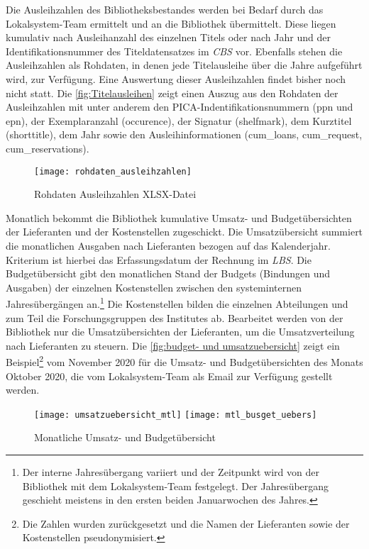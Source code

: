 Die Ausleihzahlen des Bibliotheksbestandes werden bei Bedarf durch das Lokalsystem-Team ermittelt und an die Bibliothek übermittelt. 
Diese liegen kumulativ nach Ausleihanzahl des einzelnen Titels oder nach Jahr und der Identifikationsnummer des Titeldatensatzes im 
\textit{\acrshort{CBS}} vor. Ebenfalls stehen die Ausleihzahlen als Rohdaten, in denen jede Titelausleihe über die Jahre aufgeführt wird, zur Verfügung.
Eine Auswertung dieser Ausleihzahlen findet bisher noch nicht statt. Die \autoref{fig:Titelausleihen} zeigt einen Auszug aus den Rohdaten der Ausleihzahlen mit 
unter anderem den PICA-Indentifikationsnummern (ppn und epn), der Exemplaranzahl (occurence), der Signatur (shelfmark), dem Kurztitel (shorttitle),
dem Jahr sowie den Ausleihinformationen (cum\_loans, cum\_request, cum\_reservations).


\begin{figure}[H]
    \centering
        \texttt{[image: rohdaten\_ausleihzahlen]}
        \caption{Rohdaten Ausleihzahlen XLSX-Datei}
        \label{fig:Titelausleihen}
\end{figure}


Monatlich bekommt die Bibliothek kumulative Umsatz- und Budgetübersichten der Lieferanten und der Kostenstellen zugeschickt.
Die Umsatzübersicht summiert die monatlichen Ausgaben nach Lieferanten bezogen auf das Kalenderjahr. Kriterium ist hierbei das Erfassungsdatum der Rechnung im \textit{\acrshort{LBS}}. 
Die Budgetübersicht gibt den monatlichen Stand der Budgets (Bindungen und Ausgaben) der einzelnen Kostenstellen zwischen den systeminternen Jahresübergängen an.\footnote{ Der
interne Jahresübergang variiert und der Zeitpunkt wird von der Bibliothek mit dem Lokalsystem-Team festgelegt. Der Jahresübergang geschieht meistens in den ersten beiden Januarwochen des Jahres.}
Die Kostenstellen bilden die einzelnen Abteilungen und zum Teil die Forschungsgruppen des Institutes ab.
Bearbeitet werden von der Bibliothek nur die Umsatzübersichten der Lieferanten, um die Umsatzverteilung nach Lieferanten zu steuern.
Die \autoref{fig:budget- und umsatzuebersicht} zeigt ein Beispiel\footnote{ Die Zahlen wurden zurückgesetzt und die Namen der Lieferanten sowie der Kostenstellen pseudonymisiert.}
vom November 2020 für die Umsatz- und Budgetübersichten des Monats Oktober 2020, die vom Lokalsystem-Team als Email zur Verfügung gestellt werden.


\begin{figure}[h]
    \centering
        \texttt{[image: umsatzuebersicht\_mtl]}
        \texttt{[image: mtl\_busget\_uebers]}
        \caption{Monatliche Umsatz- und Budgetübersicht}
        \label{fig:budget- und umsatzuebersicht}
\end{figure}


